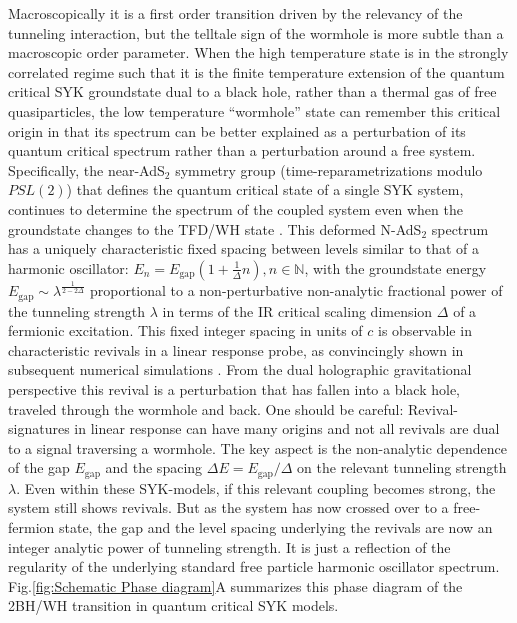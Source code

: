 Macroscopically it is a first order transition driven by the relevancy of the tunneling interaction, but the telltale sign of the wormhole is more subtle than a macroscopic order parameter. When the high temperature state is %
in the strongly correlated regime such that it is the finite temperature extension of the quantum critical SYK groundstate dual to a black hole, rather than a thermal gas of free quasiparticles, the low temperature ``wormhole'' state can remember this critical origin in that its spectrum can be better explained as a perturbation of its quantum critical spectrum rather than a perturbation around a free system. Specifically, the near-AdS$_2$ symmetry group (time-reparametrizations modulo $PSL(2)$) that defines the quantum critical state of a single SYK system, continues to determine the spectrum of the coupled system even when the groundstate changes to the TFD/WH state \cite{maldacena2018eternal}. This deformed N-AdS$_2$ spectrum has a uniquely characteristic fixed spacing between levels similar to that of a harmonic oscillator: $E_n = E_{\text{gap}}(1+ \frac{1}{\Delta}n), n \in \mathbb{N}$, with the groundstate energy $E_{\text{gap}}\sim \lambda^{\frac{1}{2-2\Delta}}$ proportional to a non-perturbative non-analytic fractional power of the tunneling strength $\lambda$ in terms of the IR critical scaling dimension $\Delta$ of a fermionic excitation. This fixed integer spacing in units of $c$ is observable in characteristic revivals in a linear response probe, as convincingly shown in subsequent numerical simulations \cite{maldacenaSYKWormholeFormation2020a,pluggeRevivalDynamicsTraversable2020a,sahoo_traversable_2020,qiCoupledSYKModel2020a}. %
From the dual holographic gravitational perspective this revival is a perturbation that has fallen into a black hole, traveled through the wormhole and back. One should be careful: Revival-signatures in linear response can have many origins and not all revivals are dual to a signal traversing a wormhole. The key aspect is the non-analytic dependence of the gap $E_{\text{gap}}$ and the spacing $\Delta E =E_{\text{gap}}/\Delta$ on the relevant tunneling strength $\lambda$. Even within these SYK-models, if this relevant coupling becomes strong, the system still shows revivals. But as the system has now crossed over to a free-fermion state, the gap and the level spacing underlying the revivals are now an integer analytic power of tunneling strength. It is just a reflection of the regularity of the underlying standard free particle harmonic oscillator spectrum. 
Fig.\ref{fig:Schematic Phase diagram}A summarizes this phase diagram of the 2BH/WH transition in quantum critical SYK models.




